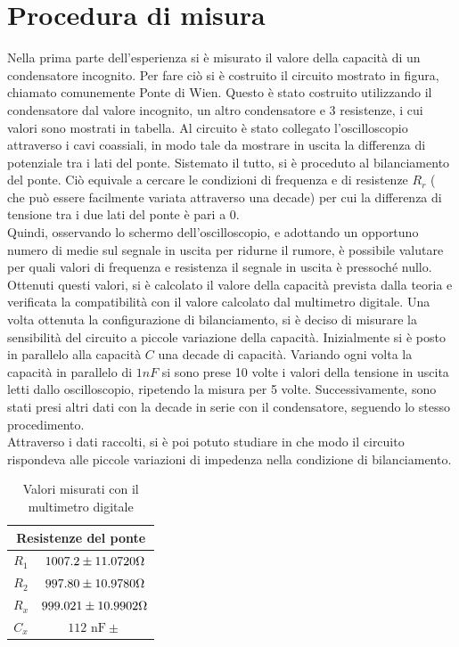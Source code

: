\documentclass[12pt,]{article}
\begin{document}
\section{Procedura di misura}
Nella prima parte dell'esperienza si è misurato il valore della capacità di un condensatore incognito. Per fare ciò si è costruito il circuito mostrato in figura, chiamato comunemente Ponte di Wien. Questo è stato costruito utilizzando il condensatore dal valore incognito, un altro condensatore e 3 resistenze, i cui valori sono mostrati in tabella.
Al circuito è stato collegato l'oscilloscopio attraverso i cavi coassiali, in modo tale da mostrare in uscita la differenza di potenziale tra i lati del ponte. Sistemato il tutto, si è proceduto al bilanciamento del ponte. Ciò equivale a cercare le condizioni di frequenza e di resistenze $R_r$ ( che può essere facilmente variata attraverso una decade) per cui la differenza di tensione tra i due lati del ponte è pari a 0. \\
Quindi, osservando lo schermo dell'oscilloscopio, e adottando un opportuno numero di medie sul segnale in uscita per ridurne il rumore, è possibile valutare per quali valori di frequenza e resistenza il segnale in uscita è pressoché nullo. Ottenuti questi valori, si è calcolato il valore della capacità prevista dalla teoria e verificata la compatibilità con il valore calcolato dal multimetro digitale. \newline \break
Una volta ottenuta la configurazione di bilanciamento, si è deciso di misurare la sensibilità del circuito a piccole variazione della capacità. Inizialmente si è posto in parallelo alla capacità $C$ una decade di capacità. Variando ogni volta la capacità in parallelo di $1 nF$ si sono prese 10 volte i valori della tensione in uscita letti dallo oscilloscopio, ripetendo la misura per 5 volte. Successivamente, sono stati presi altri dati con la decade in serie con il condensatore, seguendo lo stesso procedimento.\\
Attraverso i dati raccolti, si è poi potuto studiare in che modo il circuito rispondeva alle piccole variazioni di impedenza nella condizione di bilanciamento. 
\begin{table}[H]
\centering
\begin{tabular}{c|c}
\toprule 
\multicolumn{2}{c}{Resistenze del ponte}\\
\midrule
$R_1$ &  $1007.2\pm 11.0720 \ohm$   \\
$R_2$ &  $997.80\pm 10.9780 \ohm$  \\
$R_x$ & $999.021 \pm 10.9902 \ohm$  \\
$C_x$ & $112 \text{ nF} \pm $ \\
\bottomrule
\end{tabular}
\caption{Valori misurati con il multimetro digitale}
\end{table}
\end{document}
